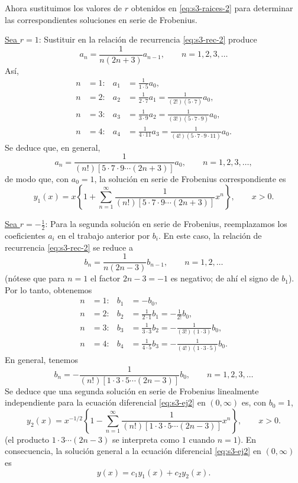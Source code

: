 \begin{example}
Ahora sustituimos los valores de $r$ obtenidos en \eqref{eq:s3-raices-2} para determinar las correspondientes soluciones en serie de Frobenius.
 
\noindent \underline{Sea $r = 1$}: Sustituir en la relación de recurrencia \eqref{eq:s3-rec-2} produce
\[ a_n = \frac{1}{n(2n+3)}a_{n-1}, \qquad n = 1, 2, 3, \dots \]
Así,
\begin{align*}
n &= 1: & a_1 &= \frac{1}{1 \cdot 5}a_0, \\
n &= 2: & a_2 &= \frac{1}{2 \cdot 7}a_1 = \frac{1}{(2!)(5 \cdot 7)}a_0, \\
n &= 3: & a_3 &= \frac{1}{3 \cdot 9}a_2 = \frac{1}{(3!)(5 \cdot 7 \cdot 9)}a_0, \\
n &= 4: & a_4 &= \frac{1}{4 \cdot 11}a_3 = \frac{1}{(4!)(5 \cdot 7 \cdot 9 \cdot 11)}a_0.
\end{align*}
Se deduce que, en general,
\[ a_n = \frac{1}{(n!)[5 \cdot 7 \cdot 9 \cdots (2n + 3)]}a_0, \qquad n = 1, 2, 3, \dots, \]
de modo que, con $a_0=1$, la solución en serie de Frobenius correspondiente es
\[ y_1(x) = x \left\{ 1 + \sum_{n=1}^{\infty} \frac{1}{(n!)[5 \cdot 7 \cdot 9 \cdots (2n + 3)]}x^n \right\}, \qquad x > 0. \]
 
\noindent \underline{Sea $r = -\frac{1}{2}$}: Para la segunda solución en serie de Frobenius, reemplazamos los coeficientes $a_i$ en el trabajo anterior por $b_i$. En este caso, la relación de recurrencia \eqref{eq:s3-rec-2} se reduce a
\[ b_n = \frac{1}{n(2n - 3)}b_{n-1}, \qquad n = 1, 2, \dots \]
(nótese que para $n=1$ el factor $2n-3=-1$ es negativo; de ahí el signo de $b_1$). Por lo tanto, obtenemos
\begin{align*}
n &= 1: & b_1 &= -b_0, \\
n &= 2: & b_2 &= \frac{1}{2 \cdot 1}b_1 = -\frac{1}{2!}b_0, \\
n &= 3: & b_3 &= \frac{1}{3 \cdot 3}b_2 = -\frac{1}{(3!)(1 \cdot 3)}b_0, \\
n &= 4: & b_4 &= \frac{1}{4 \cdot 5}b_3 = -\frac{1}{(4!)(1 \cdot 3 \cdot 5)}b_0.
\end{align*}
En general, tenemos
\[ b_n = -\frac{1}{(n!)[1 \cdot 3 \cdot 5 \cdots (2n - 3)]}b_0, \qquad n = 1, 2, 3, \dots \]
Se deduce que una segunda solución en serie de Frobenius linealmente independiente para la ecuación diferencial \eqref{eq:s3-ej2} en $(0, \infty)$ es, con $b_0=1$,
\[ y_2(x) = x^{-1/2} \left\{ 1 - \sum_{n=1}^{\infty} \frac{1}{(n!)[1 \cdot 3 \cdot 5 \cdots (2n - 3)]}x^n \right\}, \qquad x > 0. \]
(el producto $1\cdot3\cdots(2n-3)$ se interpreta como $1$ cuando $n=1$). En consecuencia, la solución general a la ecuación diferencial \eqref{eq:s3-ej2} en $(0, \infty)$ es
\[ y(x) = c_1 y_1(x) + c_2 y_2(x). \tag*{$\square$} \]
\end{example}
 
